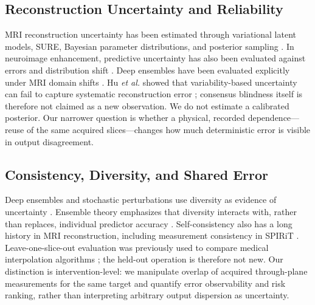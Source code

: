 \documentclass[journal,10pt]{IEEEtran}
\begin{document}
\subsection{Reconstruction Uncertainty and Reliability}
MRI reconstruction uncertainty has been estimated through variational latent models, SURE, Bayesian parameter distributions, and posterior sampling \cite{edupuganti2021uncertainty,narnhofer2022bayesian}. In neuroimage enhancement, predictive uncertainty has also been evaluated against errors and distribution shift \cite{tanno2021uncertainty}. Deep ensembles have been evaluated explicitly under MRI domain shifts \cite{kuestner2024ensembles}. Hu \emph{et al.} showed that variability-based uncertainty can fail to capture systematic reconstruction error \cite{hu2021predict}; consensus blindness itself is therefore not claimed as a new observation. We do not estimate a calibrated posterior. Our narrower question is whether a physical, recorded dependence---reuse of the same acquired slices---changes how much deterministic error is visible in output disagreement.

\subsection{Consistency, Diversity, and Shared Error}
Deep ensembles and stochastic perturbations use diversity as evidence of uncertainty \cite{lakshminarayanan2017ensembles,gal2016dropout}. Ensemble theory emphasizes that diversity interacts with, rather than replaces, individual predictor accuracy \cite{brown2005diversity,ortega2022diversity}. Self-consistency also has a long history in MRI reconstruction, including measurement consistency in SPIRiT \cite{lustig2010spirit}. Leave-one-slice-out evaluation was previously used to compare medical interpolation algorithms \cite{horvath2017highorder}; the held-out operation is therefore not new. Our distinction is intervention-level: we manipulate overlap of acquired through-plane measurements for the same target and quantify error observability and risk ranking, rather than interpreting arbitrary output dispersion as uncertainty.
\end{document}
